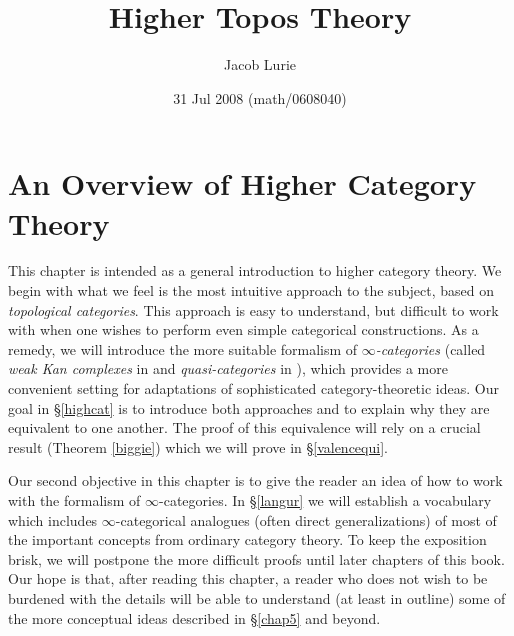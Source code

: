\documentclass{report}[10pt, final]
\theoremstyle{definition}
\begin{document}
\title{Higher Topos Theory}
\author{Jacob Lurie}
\date{31 Jul 2008 (math/0608040)}




\tableofcontents

\chapter{An Overview of Higher Category Theory}\label{chap1}
\setcounter{theorem}{0}
\setcounter{subsection}{0}
This chapter is intended as a general introduction to higher category theory. We begin with what we feel is the most intuitive approach to the subject, based on {\it topological categories}. This approach is easy to understand, but difficult to work with when one wishes to perform even simple categorical constructions. As a remedy, we will introduce the more suitable formalism of {\it $\infty$-categories} (called
{\it weak Kan complexes} in \cite{quasicat} and {\it quasi-categories} in \cite{joyalpub}), which
provides a more convenient setting for adaptations of sophisticated category-theoretic ideas.
Our goal in \S \ref{highcat} is to introduce both approaches and to explain why they are equivalent to one another. The proof of this equivalence will rely on a crucial result (Theorem \ref{biggie}) which we will prove in \S \ref{valencequi}.

Our second objective in this chapter is to give the reader an idea of how to work with the formalism of $\infty$-categories. In \S \ref{langur} we will establish a vocabulary which includes $\infty$-categorical analogues (often direct generalizations) of most of the important concepts from ordinary category theory. To keep the exposition brisk, we will postpone the more difficult proofs until later chapters of this book. Our hope is that, after reading this chapter, a reader who does not wish to be burdened with the details will be able to understand (at least in outline) some of the more conceptual ideas described in \S \ref{chap5} and beyond.






\end{document}
